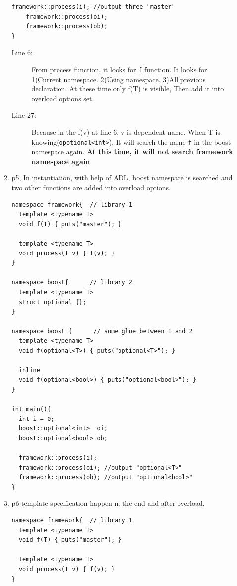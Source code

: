 \documentclass[a4paper,11pt,twoside]{book}
\begin{document}
\begin{itemize}
\begin{enumerate}
\begin{lstlisting}[numbers=none]
	framework::process(i); //output three "master"
	framework::process(oi);
	framework::process(ob);
}
\end{lstlisting}

\begin{description}
	\item[Line 6:] From process function, it looks for \texttt{f} function. It looks for 1)Current namespace. 2)Using namespace. 3)All previous declaration.
	 At these time only f(T) is visible, Then add it into overload options set.  
	 
	 \item[Line 27:] Because in the f(v) at line 6, v is dependent name. When T is knowing(\texttt{opotional<int>}), It will search the name \texttt{f} in the boost namespace again.  \textbf{At this time, it will not search framework namespace again}
\end{description}


\item p5, In instantiation, with help of ADL, boost namespace is searched and two other functions are added into overload options.

\begin{lstlisting}[numbers=none]
namespace framework{  // library 1
  template <typename T>
  void f(T) { puts("master"); }
 
  template <typename T>
  void process(T v) { f(v); } 
}
 
namespace boost{      // library 2
  template <typename T>
  struct optional {};
}
 
namespace boost {      // some glue between 1 and 2
  template <typename T>
  void f(optional<T>) { puts("optional<T>"); }
    
  inline
  void f(optional<bool>) { puts("optional<bool>"); }
}
 
int main(){
  int i = 0;
  boost::optional<int>  oi;
  boost::optional<bool> ob;
  
  framework::process(i);
  framework::process(oi); //output "optional<T>"
  framework::process(ob); //output "optional<bool>"
}
\end{lstlisting}

\item p6 template specification happen in the end and after overload. 
\begin{lstlisting}[numbers=none]
namespace framework{  // library 1
  template <typename T>
  void f(T) { puts("master"); }
 
  template <typename T>
  void process(T v) { f(v); } 
}
 

\end{lstlisting}
\end{enumerate}
\end{itemize}
\end{document}
